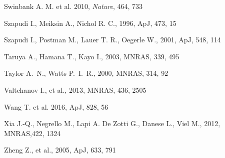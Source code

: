 \documentclass[useAMS,usenatbib]{mn2e}
\begin{document}
\begin{thebibliography}{}
 Swinbank A. M. et al. 2010, {\it Nature}, 464, 733

 Szapudi I., Meiksin A., Nichol R. C., 1996, ApJ, 473, 15

 Szapudi I., Postman M., Lauer T. R., Oegerle W., 2001, ApJ, 548, 114

 Taruya A., Hamana T., Kayo I., 2003, MNRAS, 339, 495

 Taylor A.~N., Watts P.~I.~R., 2000, MNRAS, 314, 92

 Valtchanov I., et al., 2013, MNRAS, 436, 2505

 Wang T. et al. 2016, ApJ, 828, 56

 Xia J.-Q., Negrello M., Lapi A. De Zotti G., Danese L.,
Viel M., 2012, MNRAS,422, 1324

 Zheng Z., et al., 2005, ApJ, 633, 791

\end{thebibliography}
\end{document}
